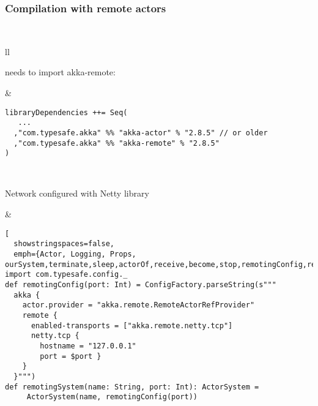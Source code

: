 \documentclass[aspectratio=169]{beamer}
\begin{document}
\begin{frame}[fragile]\frametitle{Compilation with remote actors}
~\\[-6.5mm]
\begin{tabular}{ll}
\begin{minipage}{0.18\textwidth}
  needs to import akka-remote:
\end{minipage}
&
\begin{minipage}{0.82\textwidth}
\begin{lstlisting}[emph={Actor, Logging, Props, ourSystem,terminate,sleep,actorOf,receive,become,stop}]
libraryDependencies ++= Seq(
   ...
  ,"com.typesafe.akka" %% "akka-actor" % "2.8.5" // or older
  ,"com.typesafe.akka" %% "akka-remote" % "2.8.5"
)
\end{lstlisting}
\end{minipage}
\\
\begin{minipage}{0.18\textwidth}
  Network configured with Netty library
\end{minipage}
&
\begin{minipage}{0.82\textwidth}
\begin{lstlisting}[
  showstringspaces=false,
  emph={Actor, Logging, Props, ourSystem,terminate,sleep,actorOf,receive,become,stop,remotingConfig,remotingSystem}]
import com.typesafe.config._
def remotingConfig(port: Int) = ConfigFactory.parseString(s"""
  akka {
    actor.provider = "akka.remote.RemoteActorRefProvider"
    remote {
      enabled-transports = ["akka.remote.netty.tcp"]
      netty.tcp {
        hostname = "127.0.0.1"
        port = $port }
    }
  }""")
def remotingSystem(name: String, port: Int): ActorSystem =
     ActorSystem(name, remotingConfig(port))
\end{lstlisting}
\end{minipage}
\end{tabular}
\end{frame}
\end{document}
